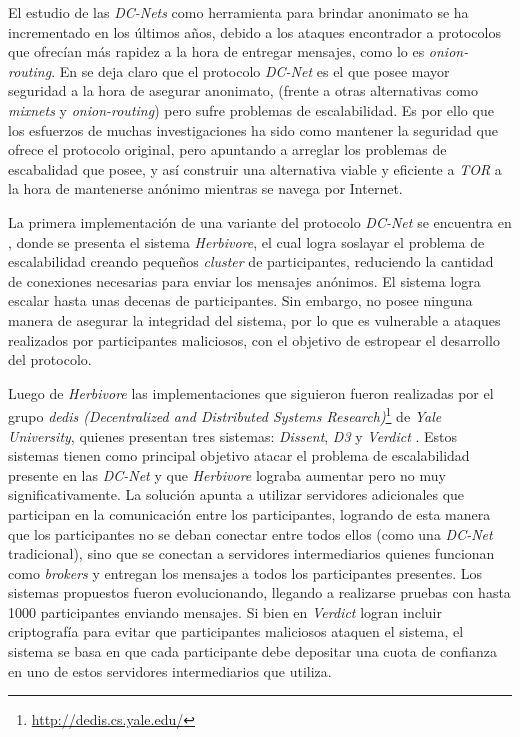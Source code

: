 El estudio de las \emph{DC-Nets} como herramienta para brindar anonimato se ha incrementado en los últimos años, debido a los ataques 
encontrador a protocolos que ofrecían más rapidez a la hora de entregar mensajes, como lo es \emph{onion-routing}. En 
\cite{wright2002analysis} se deja claro que el protocolo \emph{DC-Net} es el que posee mayor seguridad a la hora de asegurar anonimato, 
(frente a otras alternativas como \emph{mixnets} y \emph{onion-routing})
pero sufre problemas de escalabilidad. Es por ello que los esfuerzos de muchas investigaciones ha sido como mantener la 
seguridad que ofrece el protocolo original, pero apuntando a arreglar los problemas de escabalidad que posee, y así construir 
una alternativa viable y eficiente a \emph{TOR} a la hora de mantenerse anónimo mientras se navega por Internet.

La primera implementación de una variante del protocolo \emph{DC-Net} se encuentra en \cite{goel2003herbivore}, donde se presenta el 
sistema \emph{Herbivore}, el cual logra soslayar el problema de escalabilidad creando pequeños \emph{cluster} de participantes, 
reduciendo la cantidad de conexiones necesarias para enviar los mensajes anónimos. El sistema logra escalar hasta unas decenas 
de participantes. Sin embargo, no posee ninguna manera de asegurar la integridad del sistema, por lo que es vulnerable a 
ataques realizados por participantes maliciosos, con el objetivo de estropear el desarrollo del protocolo.

Luego de \emph{Herbivore} las implementaciones que siguieron fueron realizadas por el grupo 
\emph{dedis (Decentralized and Distributed Systems Research)}\footnote{\url{http://dedis.cs.yale.edu/}} de \emph{Yale University}, 
quienes presentan tres sistemas: \emph{Dissent}, \emph{D3} y \emph{Verdict} 
\cite{corrigan2010dissent, wolinsky2012dissent, wolinsky2012scalable, corrigan2012proactively}. Estos sistemas tienen como principal 
objetivo atacar el problema de escalabilidad presente en las \emph{DC-Net} y que \emph{Herbivore} lograba aumentar pero no muy 
significativamente. La solución apunta a utilizar servidores adicionales que participan 
en la comunicación entre los participantes, logrando de esta manera que los participantes no se 
deban conectar entre todos ellos (como una \emph{DC-Net} tradicional), 
sino que se conectan a servidores intermediarios quienes funcionan como \emph{brokers} y entregan los mensajes a todos los participantes 
presentes. Los sistemas propuestos fueron evolucionando, llegando a realizarse pruebas con hasta 1000 participantes enviando mensajes. 
Si bien en \emph{Verdict} logran incluir criptografía para evitar que participantes maliciosos 
ataquen el sistema, el sistema se basa en que cada participante debe depositar una cuota de 
confianza en uno de estos servidores intermediarios que utiliza. 



